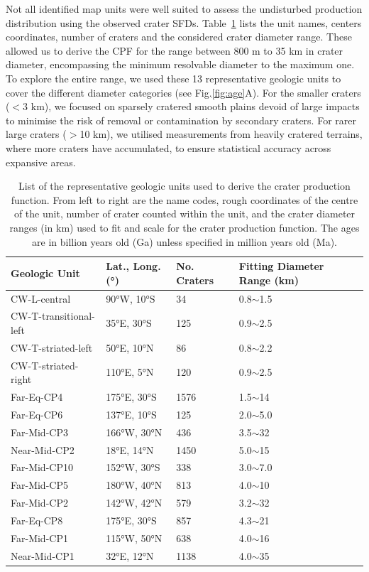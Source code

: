 \documentclass[preprint,11pt,3p,times,authoryear]{elsarticle}
\begin{document}
{%
Not all identified map units were well suited to assess the undisturbed production distribution using the observed crater SFDs. Table~\ref{tab:craters} lists the unit names, centers coordinates, number of craters and the considered crater diameter range. These allowed us to derive the CPF for the range between 800 m to 35 km in crater diameter, encompassing the minimum resolvable diameter to the maximum one. 
To explore the entire range, we used these 13 representative geologic units to cover the different diameter categories (see Fig.\ref{fig:age}A). For the smaller craters ($<$3 km), we focused on sparsely cratered smooth plains devoid of large impacts to minimise the risk of removal or contamination by secondary craters. For rarer large craters ($>$10 km), we utilised measurements from heavily cratered terrains, where more craters have accumulated, to ensure statistical accuracy across expansive areas.\\

\begin{table}[t]
\centering
    \begin{tabular}{p{4.0cm} p{3.0cm} p{2.0cm} p{3.0cm}}
\hline
\textbf{Geologic Unit} & \textbf{Lat., Long. (°)} & \textbf{No. Craters} & \textbf{Fitting Diameter Range (km)} \\
\hline
CW-L-central & 90°W, 10°S & 34 & 0.8$\sim$1.5 \\
CW-T-transitional-left & 35°E, 30°S & 125 & 0.9$\sim$2.5 \\
CW-T-striated-left & 50°E, 10°N & 86 & 0.8$\sim$2.2 \\
CW-T-striated-right & 110°E, 5°N & 120 & 0.9$\sim$2.5 \\
Far-Eq-CP4 & 175°E, 30°S & 1576 & 1.5$\sim$14 \\
Far-Eq-CP6 & 137°E, 10°S & 125 & 2.0$\sim$5.0 \\
Far-Mid-CP3 & 166°W, 30°N & 436 & 3.5$\sim$32 \\
Near-Mid-CP2 & 18°E, 14°N & 1450 & 5.0$\sim$15 \\
Far-Mid-CP10 & 152°W, 30°S & 338 & 3.0$\sim$7.0 \\
Far-Mid-CP5 & 180°W, 40°N & 813 & 4.0$\sim$10 \\
Far-Mid-CP2 & 142°W, 42°N & 579 & 3.2$\sim$32 \\
Far-Eq-CP8 & 175°E, 30°S & 857 & 4.3$\sim$21 \\
Far-Mid-CP1 & 115°W, 50°N & 638 & 4.0$\sim$16 \\
Near-Mid-CP1 & 32°E, 12°N & 1138 & 4.0$\sim$35 \\
\hline
\end{tabular}
\caption{List of the representative geologic units used to derive the crater production function. From left to right are the name codes, rough coordinates of the centre of the unit, number of crater counted within the unit, and the crater diameter ranges (in km) used to fit and scale for the crater production function. The ages are in billion years old (Ga) unless specified in million years old (Ma).}
\label{tab:craters}
\end{table}

}
\end{document}
